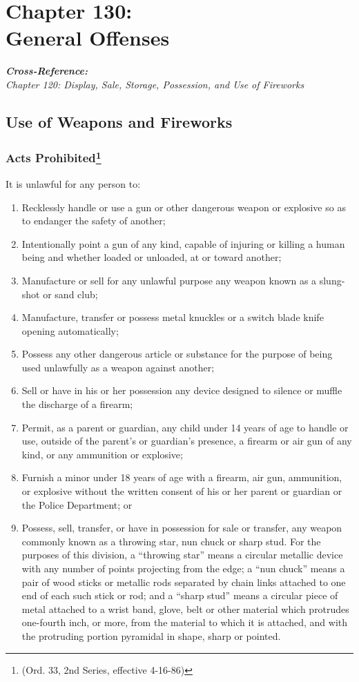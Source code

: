 \chapter*{Chapter 130: \\
	General Offenses}
    \vfill
    \minitoc
    \emph{\textbf{Cross-Reference:}\\
        {\indent}Chapter 120: Display, Sale, Storage, Possession, and Use of Fireworks}\\
    \pagebreak

\section{Use of Weapons and Fireworks}
\subsection{Acts Prohibited\footnote{(Ord. 33, 2nd Series, effective 4-16-86)}}
It is unlawful for any person to:
\begin{enumerate}[{\indent}1)]
    \item Recklessly handle or use a gun or other dangerous weapon or explosive so as to endanger the safety of another;
    \item Intentionally point a gun of any kind, capable of injuring or killing a human being and whether loaded or unloaded, at or toward another;
    \item Manufacture or sell for any unlawful purpose any weapon known as a slung-shot or sand club;
    \item Manufacture, transfer or possess metal knuckles or a switch blade knife opening automatically;
    \item Possess any other dangerous article or substance for the purpose of being used unlawfully as a weapon against another;
    \item Sell or have in his or her possession any device designed to silence or muffle the discharge of a firearm;
    \item Permit, as a parent or guardian, any child under 14 years of age to handle or use, outside of the parent’s or guardian’s presence, a firearm or air gun of any kind, or any ammunition or explosive;
    \item Furnish a minor under 18 years of age with a firearm, air gun, ammunition, or explosive without the written consent of his or her parent or guardian or the Police Department; or
    \item Possess, sell, transfer, or have in possession for sale or transfer, any weapon commonly known as a throwing star, nun chuck or sharp stud.  For the purposes of this division,  a “throwing star” means a circular metallic device with any number of points projecting from the edge; a “nun chuck” means a pair of wood sticks or metallic rods separated by chain links attached to one end of each such stick or rod; and a “sharp stud” means a circular piece of metal attached to a wrist band, glove, belt or other material which protrudes one-fourth inch, or more, from the material to which it is attached, and with the protruding portion pyramidal in shape, sharp or pointed.
\end{enumerate}
